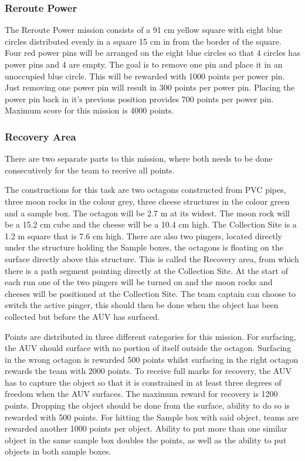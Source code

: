 		\subsubsection{Reroute Power}
\noindent The Reroute Power mission consists of a 91 cm yellow square with eight blue circles distributed evenly in a square 15 cm in from the border of the square. Four red power pins will be arranged on the eight blue circles so that 4 circles has power pins and 4 are empty. The goal is to remove one pin and place it in an unoccupied blue circle. This will be rewarded with 1000 points per power pin. Just removing one power pin will result in 300 points per power pin. Placing the power pin back in it's previous position provides 700 points per power pin. Maximum score for this mission is 4000 points. 
		\subsubsection{Recovery Area}
\noindent There are two separate parts to this mission, where both needs to be done consecutively for the team to receive all points. 

The constructions for this task are two octagons constructed from PVC pipes, three moon rocks in the colour grey, three cheese structures in the colour green and a sample box. The octagon will be 2.7 m at its widest. The moon rock will be a 15.2 cm cube and the cheese will be a 10.4 cm high. The Collection Site is a 1.2 m square that is 7.6 cm high. There are also two pingers, located directly under the structure holding the Sample boxes, the octagons is floating on the surface directly above this structure. This is called the Recovery area, from which there is a path segment pointing directly at the Collection Site. At the start of each run one of the two pingers will be turned on and the moon rocks and cheeses will be positioned at the Collection Site. The team captain can choose to switch the active pinger, this should then be done when the object has been collected but before the AUV has surfaced. 

Points are distributed in three different categories for this mission. For surfacing, the AUV should surface with no portion of itself outside the octagon. Surfacing in the wrong octagon is rewarded 500 points whilst surfacing in the right octagon rewards the team with 2000 points. To receive full marks for recovery, the AUV has to capture the object so that it is constrained in at least three degrees of freedom when the AUV surfaces. The maximum reward for recovery is 1200 points. Dropping the object should be done from the surface, ability to do so is rewarded with 500 points. For hitting the Sample box with said object, teams are rewarded another 1000 points per object. Ability to put more than one similar object in the same sample box doubles the points, as well as the ability to put objects in both sample boxes. 

